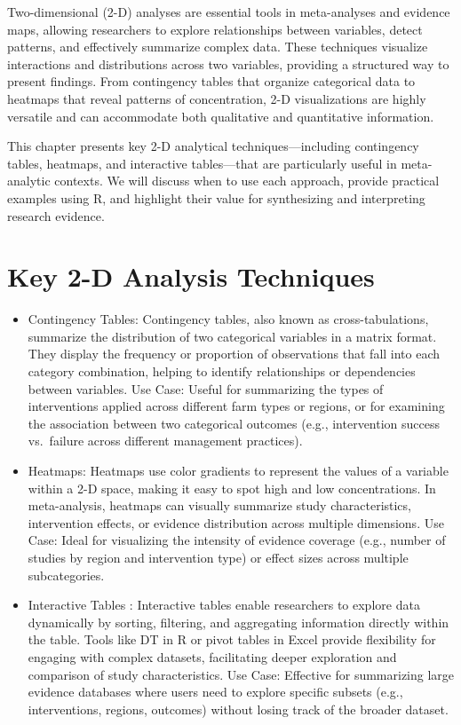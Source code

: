 \documentclass[
]{book}
\begin{document}
Two-dimensional (2-D) analyses are essential tools in meta-analyses and evidence maps, allowing researchers to explore relationships between variables, detect patterns, and effectively summarize complex data.
These techniques visualize interactions and distributions across two variables, providing a structured way to present findings.
From contingency tables that organize categorical data to heatmaps that reveal patterns of concentration, 2-D visualizations are highly versatile and can accommodate both qualitative and quantitative information.

This chapter presents key 2-D analytical techniques---including contingency tables, heatmaps, and interactive tables---that are particularly useful in meta-analytic contexts.
We will discuss when to use each approach, provide practical examples using R, and highlight their value for synthesizing and interpreting research evidence.

\section{Key 2-D Analysis Techniques}\label{key-2-d-analysis-techniques}

\begin{itemize}
\item
  Contingency Tables: Contingency tables, also known as cross-tabulations, summarize the distribution of two categorical variables in a matrix format.
  They display the frequency or proportion of observations that fall into each category combination, helping to identify relationships or dependencies between variables.
  Use Case: Useful for summarizing the types of interventions applied across different farm types or regions, or for examining the association between two categorical outcomes (e.g., intervention success vs.~failure across different management practices).
\item
  Heatmaps: Heatmaps use color gradients to represent the values of a variable within a 2-D space, making it easy to spot high and low concentrations.
  In meta-analysis, heatmaps can visually summarize study characteristics, intervention effects, or evidence distribution across multiple dimensions.
  Use Case: Ideal for visualizing the intensity of evidence coverage (e.g., number of studies by region and intervention type) or effect sizes across multiple subcategories.
\item
  Interactive Tables : Interactive tables enable researchers to explore data dynamically by sorting, filtering, and aggregating information directly within the table.
  Tools like DT in R or pivot tables in Excel provide flexibility for engaging with complex datasets, facilitating deeper exploration and comparison of study characteristics.
  Use Case: Effective for summarizing large evidence databases where users need to explore specific subsets (e.g., interventions, regions, outcomes) without losing track of the broader dataset.
\end{itemize}
\end{document}
